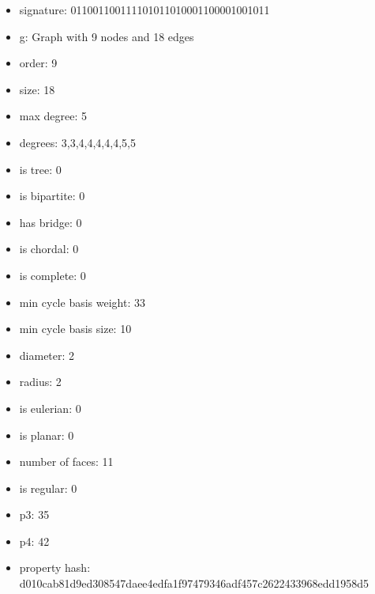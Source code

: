 \newpage
\begin{figure}
\end{figure}
\begin{itemize}
\item signature: 011001100111101011010001100001001011
\item g: Graph with 9 nodes and 18 edges
\item order: 9
\item size: 18
\item max degree: 5
\item degrees: 3,3,4,4,4,4,4,5,5
\item is tree: 0
\item is bipartite: 0
\item has bridge: 0
\item is chordal: 0
\item is complete: 0
\item min cycle basis weight: 33
\item min cycle basis size: 10
\item diameter: 2
\item radius: 2
\item is eulerian: 0
\item is planar: 0
\item number of faces: 11
\item is regular: 0
\item p3: 35
\item p4: 42
\item property hash: d010cab81d9ed308547daee4edfa1f97479346adf457c2622433968edd1958d5
\end{itemize}
